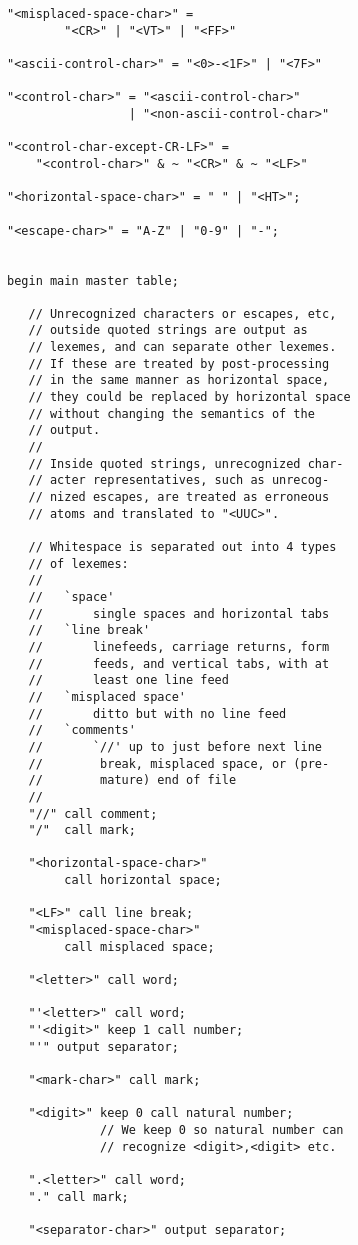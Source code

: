 \documentclass[12pt]{article}
\newenvironment{indpar}[1][0.3in]%
	{\begin{list}{}%
		     {\setlength{\itemsep}{0in}%
		      \setlength{\topsep}{0in}%
		      \setlength{\parsep}{1ex}%
		      \setlength{\labelwidth}{#1}%
		      \setlength{\leftmargin}{#1}%
		      \addtolength{\leftmargin}{\labelsep}}%
	 \item}%
	{\end{list}}
\begin{document}
\begin{indpar}
\begin{verbatim}
"<misplaced-space-char>" =
        "<CR>" | "<VT>" | "<FF>"

"<ascii-control-char>" = "<0>-<1F>" | "<7F>"

"<control-char>" = "<ascii-control-char>"
                 | "<non-ascii-control-char>"

"<control-char-except-CR-LF>" =
    "<control-char>" & ~ "<CR>" & ~ "<LF>"

"<horizontal-space-char>" = " " | "<HT>";

"<escape-char>" = "A-Z" | "0-9" | "-";


begin main master table;

   // Unrecognized characters or escapes, etc,
   // outside quoted strings are output as
   // lexemes, and can separate other lexemes.
   // If these are treated by post-processing
   // in the same manner as horizontal space,
   // they could be replaced by horizontal space
   // without changing the semantics of the
   // output.
   //
   // Inside quoted strings, unrecognized char-
   // acter representatives, such as unrecog-
   // nized escapes, are treated as erroneous
   // atoms and translated to "<UUC>".

   // Whitespace is separated out into 4 types
   // of lexemes:
   //
   //   `space'
   //       single spaces and horizontal tabs
   //   `line break'
   //       linefeeds, carriage returns, form
   //       feeds, and vertical tabs, with at
   //       least one line feed
   //   `misplaced space'
   //       ditto but with no line feed
   //   `comments'
   //       `//' up to just before next line
   //        break, misplaced space, or (pre-
   //        mature) end of file
   //
   "//" call comment;
   "/"  call mark;

   "<horizontal-space-char>"
        call horizontal space;

   "<LF>" call line break;
   "<misplaced-space-char>"
        call misplaced space;

   "<letter>" call word;

   "'<letter>" call word;
   "'<digit>" keep 1 call number;
   "'" output separator;

   "<mark-char>" call mark;

   "<digit>" keep 0 call natural number;
             // We keep 0 so natural number can
             // recognize <digit>,<digit> etc.

   ".<letter>" call word;
   "." call mark;

   "<separator-char>" output separator;


\end{verbatim}
\end{indpar}
\end{document}
